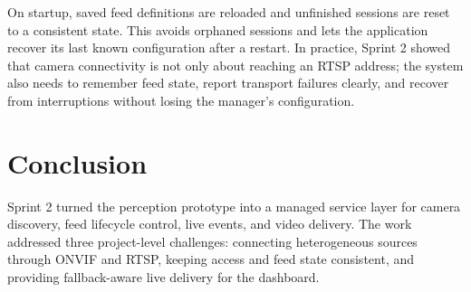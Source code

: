 On startup, saved feed definitions are reloaded and unfinished sessions are reset to a consistent state. This avoids orphaned sessions and lets the application recover its last known configuration after a restart. In practice, Sprint 2 showed that camera connectivity is not only about reaching an RTSP address; the system also needs to remember feed state, report transport failures clearly, and recover from interruptions without losing the manager's configuration.

\section{Conclusion}
Sprint 2 turned the perception prototype into a managed service layer for camera discovery, feed lifecycle control, live events, and video delivery. The work addressed three project-level challenges: connecting heterogeneous sources through ONVIF and RTSP, keeping access and feed state consistent, and providing fallback-aware live delivery for the dashboard.

